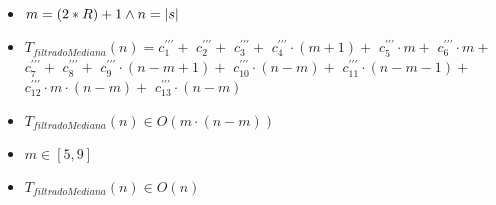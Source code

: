 \documentclass{article}
\begin{document}
    \begin{itemize}
        \item $m = (2*R) + 1 \wedge n = |s|$
        \item $T_{filtradoMediana}(n) = c^{\prime\prime\prime}_1+                       $
                                       $c^{\prime\prime\prime}_2+                       $
                                       $c^{\prime\prime\prime}_3+                       $
                                       $c^{\prime\prime\prime}_4 \cdot (m+1)+           $
                                       $c^{\prime\prime\prime}_5 \cdot m+               $
                                       $c^{\prime\prime\prime}_6 \cdot m+               $
                                       $c^{\prime\prime\prime}_7+                       $
                                       $c^{\prime\prime\prime}_8+                       $
                                       $c^{\prime\prime\prime}_9 \cdot (n-m+1)+         $
                                       $c^{\prime\prime\prime}_{10} \cdot (n-m)+        $
                                       $c^{\prime\prime\prime}_{11} \cdot (n-m-1)+      $
                                       $c^{\prime\prime\prime}_{12} \cdot m \cdot (n-m)+$
                                       $c^{\prime\prime\prime}_{13} \cdot (n-m)         $
        \item $T_{filtradoMediana}(n) \in O(m \cdot (n - m))$
        \item $ m \in [5,9]$
        \item $T_{filtradoMediana}(n) \in O(n)$
    \end{itemize}
\end{document}
